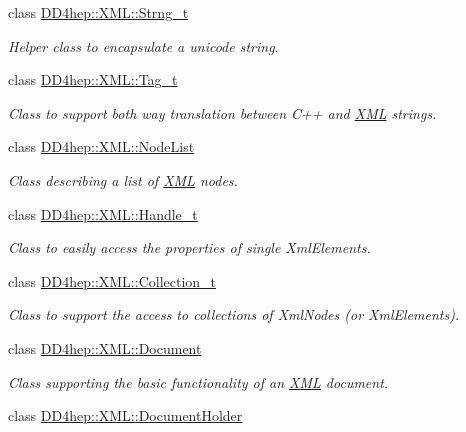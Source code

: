 \begin{DoxyCompactItemize}
class \hyperlink{class_d_d4hep_1_1_x_m_l_1_1_strng__t}{DD4hep::XML::Strng\_\-t}
\begin{DoxyCompactList}\small\item\em Helper class to encapsulate a unicode string. \item\end{DoxyCompactList}\item 
class \hyperlink{class_d_d4hep_1_1_x_m_l_1_1_tag__t}{DD4hep::XML::Tag\_\-t}
\begin{DoxyCompactList}\small\item\em Class to support both way translation between C++ and \hyperlink{namespace_d_d4hep_1_1_x_m_l}{XML} strings. \item\end{DoxyCompactList}\item 
class \hyperlink{class_d_d4hep_1_1_x_m_l_1_1_node_list}{DD4hep::XML::NodeList}
\begin{DoxyCompactList}\small\item\em Class describing a list of \hyperlink{namespace_d_d4hep_1_1_x_m_l}{XML} nodes. \item\end{DoxyCompactList}\item 
class \hyperlink{class_d_d4hep_1_1_x_m_l_1_1_handle__t}{DD4hep::XML::Handle\_\-t}
\begin{DoxyCompactList}\small\item\em Class to easily access the properties of single XmlElements. \item\end{DoxyCompactList}\item 
class \hyperlink{class_d_d4hep_1_1_x_m_l_1_1_collection__t}{DD4hep::XML::Collection\_\-t}
\begin{DoxyCompactList}\small\item\em Class to support the access to collections of XmlNodes (or XmlElements). \item\end{DoxyCompactList}\item 
class \hyperlink{class_d_d4hep_1_1_x_m_l_1_1_document}{DD4hep::XML::Document}
\begin{DoxyCompactList}\small\item\em Class supporting the basic functionality of an \hyperlink{namespace_d_d4hep_1_1_x_m_l}{XML} document. \item\end{DoxyCompactList}\item 
class \hyperlink{class_d_d4hep_1_1_x_m_l_1_1_document_holder}{DD4hep::XML::DocumentHolder}

\end{DoxyCompactItemize}
